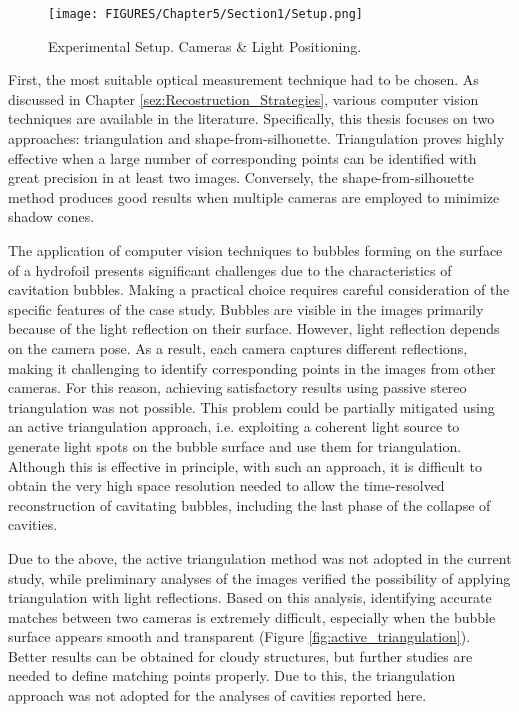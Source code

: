 \begin{figure}[htbp]
    \centering
    \texttt{[image: FIGURES/Chapter5/Section1/Setup.png]}
    \caption{Experimental Setup. Cameras \& Light Positioning.}
    \label{fig:setup}
\end{figure}

First, the most suitable optical measurement technique had to be chosen. As discussed in Chapter \ref{sez:Recostruction_Strategies}, various computer vision techniques are available in the literature. Specifically, this thesis focuses on two approaches: triangulation and shape-from-silhouette. Triangulation proves highly effective when a large number of corresponding points can be identified with great precision in at least two images. Conversely, the shape-from-silhouette method produces good results when multiple cameras are employed to minimize shadow cones.

The application of computer vision techniques to bubbles forming on the surface of a hydrofoil presents significant challenges due to the characteristics of cavitation bubbles. Making a practical choice requires careful consideration of the specific features of the case study.
Bubbles are visible in the images primarily because of the light reflection on their surface. However, light reflection depends on the camera pose. As a result, each camera captures different reflections, making it challenging to identify corresponding points in the images from other cameras. For this reason, achieving satisfactory results using passive stereo triangulation was not possible.
This problem could be partially mitigated using an active triangulation approach, i.e. exploiting a coherent light source to generate light spots on the bubble surface and use them for triangulation.
Although this is effective in principle, with such an approach, it is difficult to obtain the very high space resolution needed to allow the time-resolved reconstruction of cavitating bubbles, including the last phase of the collapse of cavities.

Due to the above, the active triangulation method was not adopted in the current study, while preliminary analyses of the images verified the possibility of applying triangulation with light reflections. Based on this analysis, identifying accurate matches between two cameras is extremely difficult, especially when the bubble surface appears smooth and transparent (Figure \ref{fig:active_triangulation}). Better results can be obtained for cloudy structures, but further studies are needed to define matching points properly. Due to this, the triangulation approach was not adopted for the analyses of cavities reported here. 

